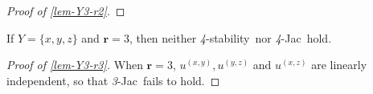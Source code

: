 \documentclass[12pt,a4paper,twoside]{article}
\makeatletter
\newcommand{\srcsize}{\@setfontsize{\srcsize}{3pt}{3pt}}
\newcommand\mdoubleplus{\text{\srcsize$+\mkern-2mu+$}}
\newcommand{\aextb}{\mathbin{\acute{\mathbin{\mathcal R}}}}
\newcommand{\xy}{{(x, y)}}
\newcommand{\yz}{{(y,z)}}
\newcommand{\xz}{{(x,z)}}
\newcommand{\stability}{\textit{4}-\textup{{stability}}}
\newcommand{\fourjac}{\textup{\textit{4}-Jac}}
\newcommand{\threejac}{\textup{\textit{3}-Jac}}
\makeatother
\begin{document}
\begin{appendices}
\begin{proof}[Proof of \cref{lem-Y3-r2}]
\end{proof}

\begin{lemma}\label{lem-Y3-r3}
  If $Y = \{x,y,z\}$ and  $\mathbf{r} = 3$, then neither \stability\ nor
  \fourjac\ hold.
\end{lemma}
\begin{proof}[Proof of \cref{lem-Y3-r3}]
  When $\mathbf r = 3$, $u^{\xy}, u^{\yz}$ and $u^{\xz}$ are linearly
  independent, so that \threejac\ fails to hold.


\end{proof}
\end{appendices}
\end{document}
